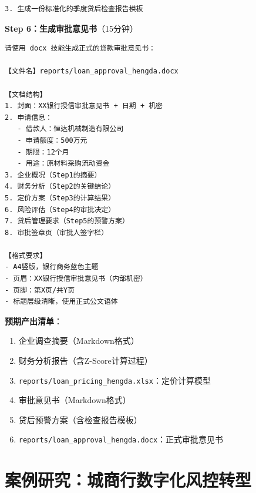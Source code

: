 \begin{exercisebox}
\begin{lstlisting}
3. 生成一份标准化的季度贷后检查报告模板
\end{lstlisting}

\textbf{Step 6：生成审批意见书}（15分钟）

\begin{lstlisting}
请使用 docx 技能生成正式的贷款审批意见书：

【文件名】reports/loan_approval_hengda.docx

【文档结构】
1. 封面：XX银行授信审批意见书 + 日期 + 机密
2. 申请信息：
   - 借款人：恒达机械制造有限公司
   - 申请额度：500万元
   - 期限：12个月
   - 用途：原材料采购流动资金
3. 企业概况（Step1的摘要）
4. 财务分析（Step2的关键结论）
5. 定价方案（Step3的计算结果）
6. 风险评估（Step4的审批决定）
7. 贷后管理要求（Step5的预警方案）
8. 审批签章页（审批人签字栏）

【格式要求】
- A4竖版，银行商务蓝色主题
- 页眉：XX银行授信审批意见书（内部机密）
- 页脚：第X页/共Y页
- 标题层级清晰，使用正式公文语体
\end{lstlisting}

\textbf{预期产出清单}：
\begin{enumerate}[leftmargin=2em]
  \item 企业调查摘要（Markdown格式）
  \item 财务分析报告（含Z-Score计算过程）
  \item \texttt{reports/loan\_pricing\_hengda.xlsx}：定价计算模型
  \item 审批意见书（Markdown格式）
  \item 贷后预警方案（含检查报告模板）
  \item \texttt{reports/loan\_approval\_hengda.docx}：正式审批意见书
\end{enumerate}

\end{exercisebox}

\section{案例研究：城商行数字化风控转型}

